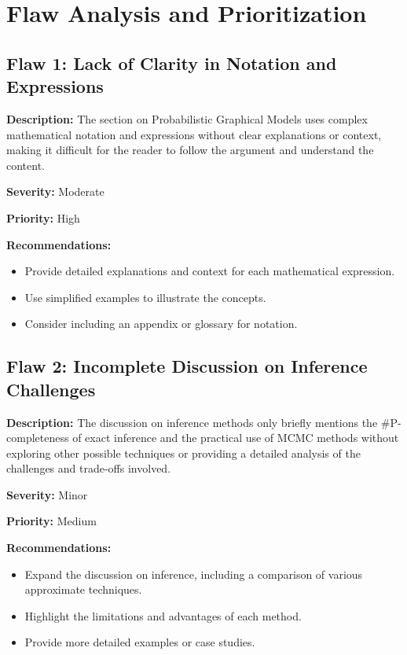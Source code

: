 \documentclass{article}
\begin{document}
\section*{Flaw Analysis and Prioritization}

\subsection*{Flaw 1: Lack of Clarity in Notation and Expressions}

\textbf{Description:} The section on Probabilistic Graphical Models uses complex mathematical notation and expressions without clear explanations or context, making it difficult for the reader to follow the argument and understand the content.

\textbf{Severity:} Moderate

\textbf{Priority:} High

\textbf{Recommendations:}
\begin{itemize}
    \item Provide detailed explanations and context for each mathematical expression.
    \item Use simplified examples to illustrate the concepts.
    \item Consider including an appendix or glossary for notation.
\end{itemize}

\subsection*{Flaw 2: Incomplete Discussion on Inference Challenges}

\textbf{Description:} The discussion on inference methods only briefly mentions the #P-completeness of exact inference and the practical use of MCMC methods without exploring other possible techniques or providing a detailed analysis of the challenges and trade-offs involved.

\textbf{Severity:} Minor

\textbf{Priority:} Medium

\textbf{Recommendations:}
\begin{itemize}
    \item Expand the discussion on inference, including a comparison of various approximate techniques.
    \item Highlight the limitations and advantages of each method.
    \item Provide more detailed examples or case studies.
\end{itemize}
\end{document}
